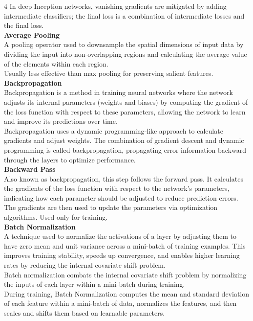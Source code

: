 \documentclass[8pt]{extarticle}
\begin{document}
\begin{multicols}{4}
In deep Inception networks, vanishing gradients are mitigated by adding intermediate classifiers; the final loss is a combination of intermediate losses and the final loss.\\
\vspace{2pt}\textbf{Average Pooling}\\
A pooling operator used to downsample the spatial dimensions of input data by dividing the input into non‑overlapping regions and calculating the average value of the elements within each region.\\
Usually less effective than max pooling for preserving salient features.\\
\vspace{2pt}\textbf{Backpropagation}\\
Backpropagation is a method in training neural networks where the network adjusts its internal parameters (weights and biases) by computing the gradient of the loss function with respect to these parameters, allowing the network to learn and improve its predictions over time.\\
Backpropagation uses a dynamic programming‑like approach to calculate gradients and adjust weights. The combination of gradient descent and dynamic programming is called backpropagation, propagating error information backward through the layers to optimize performance.\\
\vspace{2pt}\textbf{Backward Pass}\\
Also known as backpropagation, this step follows the forward pass. It calculates the gradients of the loss function with respect to the network’s parameters, indicating how each parameter should be adjusted to reduce prediction errors. The gradients are then used to update the parameters via optimization algorithms. Used only for training.\\
\vspace{2pt}\textbf{Batch Normalization}\\
A technique used to normalize the activations of a layer by adjusting them to have zero mean and unit variance across a mini-batch of training examples. This improves training stability, speeds up convergence, and enables higher learning rates by reducing the internal covariate shift problem.\\
Batch normalization combats the internal covariate shift problem by normalizing the inputs of each layer within a mini-batch during training.\\
During training, Batch Normalization computes the mean and standard deviation of each feature within a mini-batch of data, normalizes the features, and then scales and shifts them based on learnable parameters.\\

\end{multicols}
\end{document}
